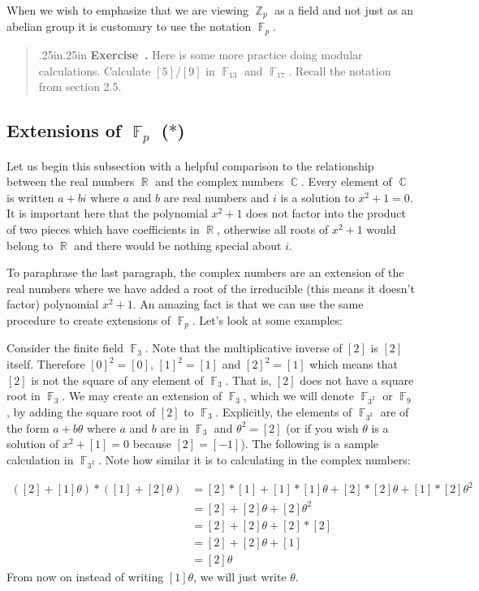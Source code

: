 \documentclass[12 pt]{article}
\DeclareMathOperator{\R}{\mathbb{R}}
\DeclareMathOperator{\C}{\mathbb{C}}
\DeclareMathOperator{\Z}{\mathbb{Z}}
\DeclareMathOperator{\F}{\mathbb{F}}
\newcounter{exercise}[section]
\newenvironment{exercise}{\refstepcounter{exercise}\par\bigskip \begin{quotation}{}{\leftmargin .25in\rightmargin .25in}
	\noindent \textbf{Exercise~\thesection.\theexercise }  \rmfamily}{\end{quotation}\par\bigskip}
\begin{document}
When we wish to emphasize that we are viewing $\Z_p$ as a field and not just as an abelian group it is customary to use the notation $\F_p$.

\begin{exercise}
Here is some more practice doing modular calculations. Calculate $[5]/[9]$ in $\F_{13}$ and $\F_{17}$. Recall the notation from section 2.5.
\end{exercise}

\subsection{Extensions of $\F_p$ ($*$)}
Let us begin this subsection with a helpful comparison to the relationship between the real numbers $\R$ and the complex numbers $\C$. Every element of $\C$ is written $a+bi$ where $a$ and $b$ are real numbers and $i$ is a solution to $x^2+1=0$. It is important here that the polynomial $x^2+1$ does not factor into the product of two pieces which have coefficients in $\R$, otherwise all roots of $x^2+1$ would belong to $\R$ and there would be nothing special about $i$.

To paraphrase the last paragraph, the complex numbers are an extension of the real numbers where we have added a root of the irreducible (this means it doesn't factor) polynomial $x^2+1$. An amazing fact is that we can use the same procedure to create extensions of $\F_p$. Let's look at some examples:

Consider the finite field $\F_3$. Note that the multiplicative inverse of $[2]$ is $[2]$ itself. Therefore $[0]^2=[0]$, $[1]^2=[1]$ and $[2]^2=[1]$ which means that $[2]$ is not the square of any element of $\F_3$. That is, $[2]$ does not have a square root in $\F_3$. We may create an extension of $\F_3$, which we will denote $\F_{3^2}$ or $\F_9$, by adding the square root of $[2]$ to $\F_3$. Explicitly, the elements of $\F_{3^2}$ are of the form $a+b\theta$ where $a$ and $b$ are in $\F_3$ and $\theta^2=[2]$ (or if you wish $\theta$ is a solution of $x^2+[1]=0$ because $[2]=[-1]$). The following is a sample calculation in $\F_{3^2}$. Note how similar it is to calculating in the complex numbers:

\begin{align*}
([2]+[1]\theta)*([1]+[2]\theta)&=[2]*[1]+[1]*[1]\theta+[2]*[2]\theta+[1]*[2]\theta^2 \\
&=[2]+[2]\theta+[2]\theta^2 \\
&=[2]+[2]\theta+[2]*[2] \\
&=[2]+[2]\theta+[1] \\
&=[2]\theta
\end{align*}
From now on instead of writing $[1]\theta$, we will just write $\theta$.
\end{document}
